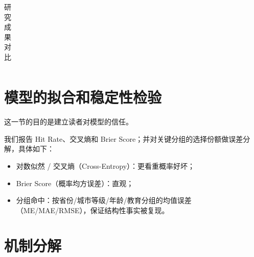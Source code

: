 \documentclass[
  a4paper,
  zihao=-4,
  fontset=mac,
  AutoFakeBold,
  AutoFakeSlant,
  oneside]{ctexbook}
\begin{document}
\begin{table}[!ht]
\centering
\caption{研究成果对比}
\begin{tabularx}{\textwidth}{@{}cXXX@{}}
\toprule
\midrule
\bottomrule
\end{tabularx}
\label{tab:研究成果对比}
\end{table}



\section{模型的拟合和稳定性检验} 

这一节的目的是建立读者对模型的信任。

我们报告 Hit Rate、交叉熵和 Brier Score；并对关键分组的选择份额做误差分解，具体如下：
\begin{itemize}
  \item 对数似然 / 交叉熵（Cross-Entropy）：更看重概率好坏；
  \item Brier Score（概率均方误差）：直观；
  \item 分组命中：按省份/城市等级/年龄/教育分组的均值误差（ME/MAE/RMSE），保证结构性事实被复现。
\end{itemize}








\section{机制分解} %
\label{sec:机制分解}
\end{document}
